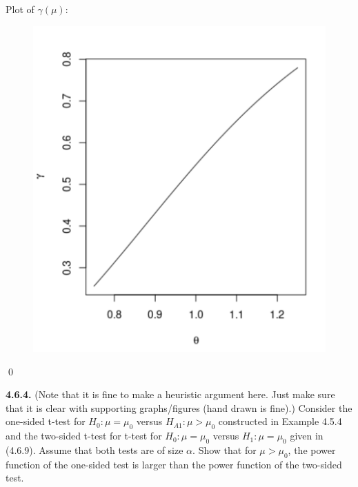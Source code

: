\documentclass{book}
\theoremstyle{definition}
\begin{document}
\begin{enumerate}[(a)]
	\noindent Plot of $\gamma(\mu)$:
	\begin{figure}[!htb]
		\centering
		\includegraphics[scale=0.35]{power}
	\end{figure} 
	

\end{enumerate}
\qed












\newpage
\noindent \textbf{4.6.4.} (Note that it is fine to make a heuristic argument here. Just make sure that it is clear with
supporting graphs/figures (hand drawn is fine).) Consider the one-sided t-test for $H_0 : \mu = \mu_0$ versus $H_{A1} : \mu>\mu_0$ constructed in Example 4.5.4 and the two-sided t-test for t-test for $H_0 : \mu = \mu_0$ versus
$H_1 : \mu = \mu_0$ given in (4.6.9). Assume that both tests are of size $\alpha$. Show that for
$\mu>\mu_0$, the power function of the one-sided test is larger than the power function of the two-sided test.\\
\end{document}

